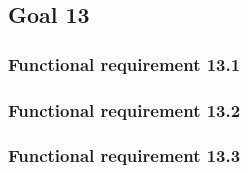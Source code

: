 \subsection{Goal 13}

\setcounter{secnumdepth}{3}
\subsubsection{Functional requirement 13.1}

\subsubsection{Functional requirement 13.2}

\subsubsection{Functional requirement 13.3}
